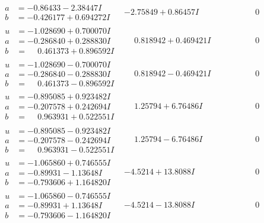 \documentclass[1p]{elsarticle_modified}
\theoremstyle{definition}
\begin{document}
$$\begin{array}{c|c|c}
\begin{aligned}
a &= -0.86433 - 2.38447 I \\
b &= -0.426177 + 0.694272 I\end{aligned}
 & -2.75849 + 0.86457 I & \phantom{-0.000000 } 0 \\ \hline\begin{aligned}
u &= -1.028690 + 0.700070 I \\
a &= -0.286840 + 0.288830 I \\
b &= \phantom{-}0.461373 + 0.896592 I\end{aligned}
 & \phantom{-}0.818942 + 0.469421 I & \phantom{-0.000000 } 0 \\ \hline\begin{aligned}
u &= -1.028690 - 0.700070 I \\
a &= -0.286840 - 0.288830 I \\
b &= \phantom{-}0.461373 - 0.896592 I\end{aligned}
 & \phantom{-}0.818942 - 0.469421 I & \phantom{-0.000000 } 0 \\ \hline\begin{aligned}
u &= -0.895085 + 0.923482 I \\
a &= -0.207578 + 0.242694 I \\
b &= \phantom{-}0.963931 + 0.522551 I\end{aligned}
 & \phantom{-}1.25794 + 6.76486 I & \phantom{-0.000000 } 0 \\ \hline\begin{aligned}
u &= -0.895085 - 0.923482 I \\
a &= -0.207578 - 0.242694 I \\
b &= \phantom{-}0.963931 - 0.522551 I\end{aligned}
 & \phantom{-}1.25794 - 6.76486 I & \phantom{-0.000000 } 0 \\ \hline\begin{aligned}
u &= -1.065860 + 0.746555 I \\
a &= -0.89931 - 1.13648 I \\
b &= -0.793606 + 1.164820 I\end{aligned}
 & -4.5214 + 13.8088 I & \phantom{-0.000000 } 0 \\ \hline\begin{aligned}
u &= -1.065860 - 0.746555 I \\
a &= -0.89931 + 1.13648 I \\
b &= -0.793606 - 1.164820 I\end{aligned}
 & -4.5214 - 13.8088 I & \phantom{-0.000000 } 0 \\ \hline\begin{aligned}

\end{aligned}
\end{array}$$
\end{document}
